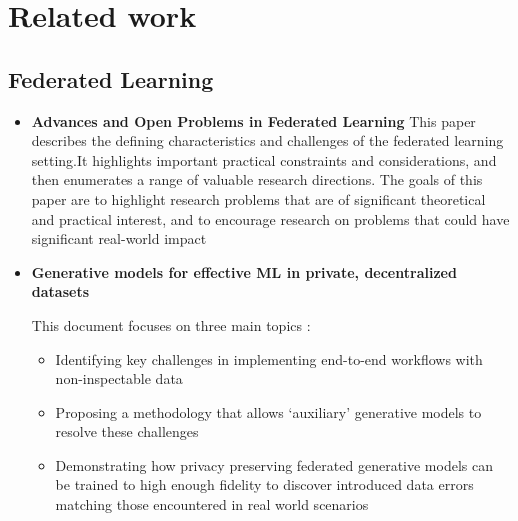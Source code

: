 

\section{Related work}

\subsection{Federated Learning}

\begin{frame}
\begin{itemize}

\item \textbf{Advances and Open Problems in Federated Learning\cite{kairouz_advances_2021}}
This paper describes the defining characteristics and challenges of the federated learning setting.It highlights important practical constraints and considerations, and then enumerates a range of valuable research directions. The goals of this paper are to highlight research problems that are of significant theoretical and practical interest, and to encourage research on problems that could have significant real-world impact
\end{itemize}

\begin{itemize}
\item \textbf{Generative models for effective ML in  private, decentralized datasets\cite{augenstein_generative_2020}}

This document focuses on three main topics : 
\begin{itemize}
\item Identifying key challenges in implementing end-to-end workflows with non-inspectable data
\item Proposing a methodology that allows ‘auxiliary’ generative models to resolve these challenges
\item Demonstrating how privacy preserving federated generative models can be trained to high enough fidelity to discover introduced data errors matching those encountered in real world scenarios
\end{itemize}
\end{itemize}
\end{frame}

